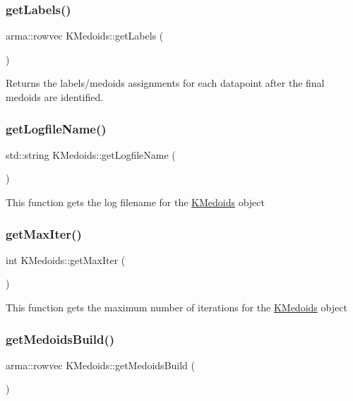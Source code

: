 \subsubsection{\texorpdfstring{get\+Labels()}{getLabels()}}
{\footnotesize\ttfamily arma\+::rowvec K\+Medoids\+::get\+Labels (\begin{DoxyParamCaption}{ }\end{DoxyParamCaption})}

Returns the labels/medoids assignments for each datapoint after the final medoids are identified. \mbox{\label{classKMedoids_ad5982ef2a71cce9f1f45b98c55350391}} 
\subsubsection{\texorpdfstring{get\+Logfile\+Name()}{getLogfileName()}}
{\footnotesize\ttfamily std\+::string K\+Medoids\+::get\+Logfile\+Name (\begin{DoxyParamCaption}{ }\end{DoxyParamCaption})}

This function gets the log filename for the \hyperlink{classKMedoids}{K\+Medoids} object \mbox{\label{classKMedoids_ac0569206113015abb38954f78a194eb5}} 
\subsubsection{\texorpdfstring{get\+Max\+Iter()}{getMaxIter()}}
{\footnotesize\ttfamily int K\+Medoids\+::get\+Max\+Iter (\begin{DoxyParamCaption}{ }\end{DoxyParamCaption})}

This function gets the maximum number of iterations for the \hyperlink{classKMedoids}{K\+Medoids} object \mbox{\label{classKMedoids_a54370d8d0f5c500f5deb859a9eab891c}} 
\subsubsection{\texorpdfstring{get\+Medoids\+Build()}{getMedoidsBuild()}}
{\footnotesize\ttfamily arma\+::rowvec K\+Medoids\+::get\+Medoids\+Build (\begin{DoxyParamCaption}{ }\end{DoxyParamCaption})}


